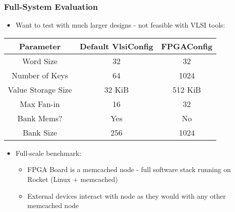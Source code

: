 \frametitle{Full-System Evaluation}

\begin{itemize}
    \item Want to test with much larger designs - not feasible with VLSI tools:
\end{itemize}


    \begin{center}
        \begin{tabular}{ c | c | c}
            Parameter          & Default VlsiConfig & FPGAConfig \\ \hline
            Word Size          & 32                 & 32 \\
            Number of Keys     & 64                 & 1024 \\
            Value Storage Size & 32 KiB             & 512 KiB \\
            Max Fan-in         & 16                 & 32 \\
            Bank Mems?         & Yes                & No \\
            Bank Size          & 256                & 1024 
        \end{tabular}
    \end{center}

\begin{itemize}
    \item Full-scale benchmark:
        \begin{itemize}
            \item FPGA Board is a memcached node - full software stack running on Rocket (Linux + memcached)
            \item External devices interact with node as they would with any other memcached node
        \end{itemize}
\end{itemize}


